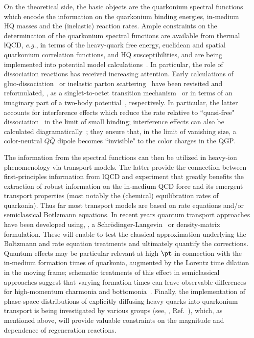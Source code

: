 \documentclass[../report.tex]{subfiles}
\begin{document}
On the theoretical side, the basic objects are the quarkonium spectral functions which 
encode the information on the quarkonium binding energies, in-medium HQ masses and the
(inelastic) reaction rates.  Ample constraints on the determination of the quarkonium
spectral functions are available from thermal lQCD, {\it e.g.}, in terms of the heavy-quark
free energy, euclidean and spatial quarkonium correlation functions, and HQ susceptibilities,
and are being implemented into potential model 
calculations~\cite{Wong:2004zr,Mocsy:2005qw,Alberico:2006vw,Brambilla:2008cx,Riek:2010py,Burnier:2015tda,Liu:2017qah}.
In particular, the role of dissociation reactions has received increasing attention.
Early calculations of gluo-dissociation~\cite{Bhanot:1979vb,Kharzeev:1994pz} or inelastic 
parton scattering~\cite{Grandchamp:2001pf} have been revisited and reformulated, \eg, 
as a singlet-to-octet transition mechanism~\cite{Brambilla:2008cx} or in terms of an 
imaginary part of a two-body potential~\cite{Laine:2006ns}, respectively. In particular, 
the latter accounts for interference effects which reduce the rate relative to 
``quasi-free" dissociation~\cite{Grandchamp:2001pf} in the limit of small binding; 
interference effects can also be calculated diagramatically~\cite{Park:2007zza}; they 
ensure that, in the limit of vanishing size, a color-neutral $Q\bar Q$ dipole 
becomes ``invisible" to the color charges in the QGP.

The information from the spectral functions can then be utilized in heavy-ion phenomenology
via transport models. The latter provide the connection between first-principles
information from lQCD and experiment that greatly benefits the extraction of robust information 
on the in-medium QCD force and its emergent transport properties (most notably the (chemical)
equilibration rates of quarkonia). 
Thus far most transport models are based on rate equations and/or
semiclassical Botlzmann equations. In recent years quantum transport approaches have 
been developed using, \eg, a Schr\"odinger-Langevin~\cite{Blaizot:2015hya,Katz:2015qja,Kajimoto:2017rel} 
or density-matrix~\cite{Akamatsu:2014qsa,Brambilla:2016wgg} formulation. These will enable to  
test the classical approximation underlying the Boltzmann and rate equation treatments and 
ultimately quantify the corrections.  Quantum effects may be particular 
relevant at high $\pt$ in connection with the in-medium formation times of quarkonia, 
augmented by the Lorentz time dilation in the moving frame; schematic treatments of
this effect in semiclassical approaches suggest that varying formation times can leave 
observable differences for high-momentum charmonia and 
bottomonia~\cite{Song:2015bja,Hoelck:2016tqf,Du:2017qkv,Aronson:2017ymv,Krouppa:2017jlg}. 
Finally, the implementation of phase-space distributions of explicitly diffusing heavy quarks 
into quarkonium transport is being investigated by various groups (see, \eg, 
Ref.~\cite{Yao:2017fuc}), which, as mentioned above, will provide valuable constraints on the 
magnitude and \pt dependence of regeneration 
reactions.     
\end{document}
